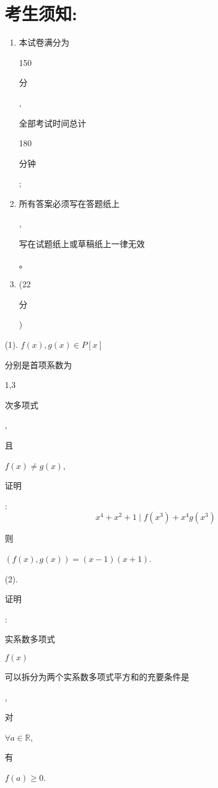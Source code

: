 \documentclass[10pt]{article}
\begin{document}
\section{考生须知:}
\begin{enumerate}
  \item \begin{CJK}{UTF8}{mj}本试卷满分为\end{CJK} 150 \begin{CJK}{UTF8}{mj}分\end{CJK}, \begin{CJK}{UTF8}{mj}全部考试时间总计\end{CJK} 180 \begin{CJK}{UTF8}{mj}分钟\end{CJK};

  \item \begin{CJK}{UTF8}{mj}所有答案必须写在答题纸上\end{CJK}, \begin{CJK}{UTF8}{mj}写在试题纸上或草稿纸上一律无效\end{CJK}。

  \item (22 \begin{CJK}{UTF8}{mj}分\end{CJK})

\end{enumerate}
(1). $f(x), g(x) \in P[x]$ \begin{CJK}{UTF8}{mj}分别是首项系数为\end{CJK} 1,3 \begin{CJK}{UTF8}{mj}次多项式\end{CJK}, \begin{CJK}{UTF8}{mj}且\end{CJK} $f(x) \neq g(x)$, \begin{CJK}{UTF8}{mj}证明\end{CJK}:
$$
x^{4}+x^{2}+1 \mid f\left(x^{3}\right)+x^{4} g\left(x^{3}\right)
$$
\begin{CJK}{UTF8}{mj}则\end{CJK} $(f(x), g(x))=(x-1)(x+1)$.

(2). \begin{CJK}{UTF8}{mj}证明\end{CJK}: \begin{CJK}{UTF8}{mj}实系数多项式\end{CJK} $f(x)$ \begin{CJK}{UTF8}{mj}可以拆分为两个实系数多项式平方和的充要条件是\end{CJK}, \begin{CJK}{UTF8}{mj}对\end{CJK} $\forall a \in \mathbb{R}$, \begin{CJK}{UTF8}{mj}有\end{CJK} $f(a) \geq 0$.
\end{document}
